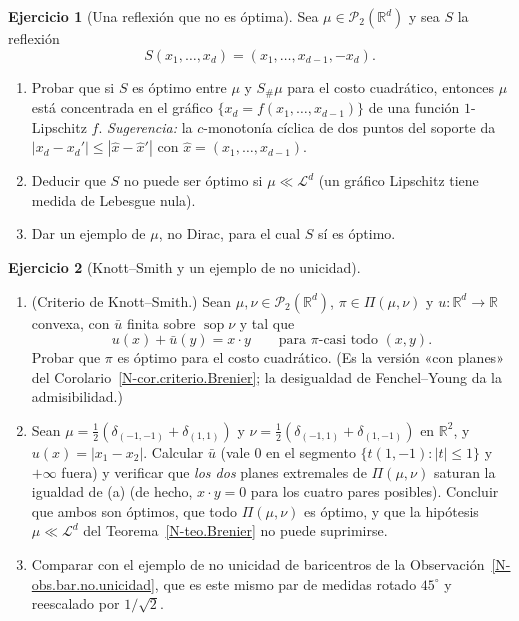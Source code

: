 \documentclass[11pt,a4paper]{amsart}
\newcounter{chapter}
\def\sop{\operatorname {\mathrm{sop}}}
\newcommand{\R}{{\mathbb R}}
\newcommand{\LL}{{\mathcal L}}
\theoremstyle{remark}
\theoremstyle{definition}
\newtheorem{ejercicio}{Ejercicio}[chapter]
\numberwithin{subsection}{section}
\numberwithin{equation}{section}
\begin{document}
\begin{ejercicio}[Una reflexión que no es óptima]\label{ejer.Brenier.reflexion}
Sea $\mu\in\mathcal P_2(\R^d)$ y sea $S$ la reflexión
\[
S(x_1,\dots,x_d)=(x_1,\dots,x_{d-1},-x_d).
\]
\begin{enumerate}[label=(\alph*)]
\item Probar que si $S$ es óptimo entre $\mu$ y $S_\#\mu$ para el costo
cuadrático, entonces $\mu$ está concentrada en el gráfico
$\{x_d=f(x_1,\dots,x_{d-1})\}$ de una función $1$-Lipschitz $f$.
\emph{Sugerencia:} la $c$-monotonía cíclica de dos puntos del soporte da
$|x_d-x_d'|\le|\hat x-\hat x'|$ con $\hat x=(x_1,\dots,x_{d-1})$.
\item Deducir que $S$ no puede ser óptimo si $\mu\ll\LL^d$ (un gráfico
Lipschitz tiene medida de Lebesgue nula).
\item Dar un ejemplo de $\mu$, no Dirac, para el cual $S$ sí es óptimo.
\end{enumerate}
\end{ejercicio}

\begin{ejercicio}[Knott--Smith y un ejemplo de no unicidad]\label{ejer.Brenier.KnottSmith}
\leavevmode
\begin{enumerate}[label=(\alph*)]
\item (Criterio de Knott--Smith.) Sean $\mu,\nu\in\mathcal P_2(\R^d)$,
$\pi\in\Pi(\mu,\nu)$ y $u\colon\R^d\to\R$ convexa, con $\bar u$ finita
sobre $\sop\nu$ y tal que
\[
u(x)+\bar u(y)=x\cdot y\qquad\text{para $\pi$-casi todo }(x,y).
\]
Probar que $\pi$ es óptimo para el costo
cuadrático. (Es la versión «con planes» del
Corolario~\ref{N-cor.criterio.Brenier}; la desigualdad de Fenchel--Young da
la admisibilidad.)
\item Sean $\mu=\frac12(\delta_{(-1,-1)}+\delta_{(1,1)})$ y
$\nu=\frac12(\delta_{(-1,1)}+\delta_{(1,-1)})$ en $\R^2$, y
$u(x)=|x_1-x_2|$. Calcular $\bar u$ (vale $0$ en el segmento
$\{t(1,-1):|t|\le1\}$ y $+\infty$ fuera) y verificar que \emph{los dos}
planes extremales de $\Pi(\mu,\nu)$ saturan la igualdad de (a) (de hecho,
$x\cdot y=0$ para los cuatro pares posibles). Concluir que ambos son
óptimos, que todo $\Pi(\mu,\nu)$ es óptimo, y que la hipótesis
$\mu\ll\LL^d$ del Teorema~\ref{N-teo.Brenier} no puede suprimirse.
\item Comparar con el ejemplo de no unicidad de baricentros de la
Observación~\ref{N-obs.bar.no.unicidad}, que es este mismo par de medidas
rotado $45^\circ$ y reescalado por $1/\sqrt2$.
\end{enumerate}
\end{ejercicio}
\end{document}
